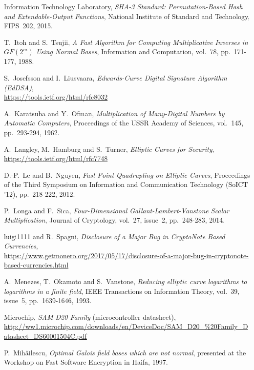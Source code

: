 \documentclass{llncs}
\newcommand{\GF}{GF}
\begin{document}
\begin{thebibliography}{20}
Information Technology Laboratory,
\emph{SHA-3 Standard: Permutation-Based Hash and Extendable-Output
Functions},
National Institute of Standard and Technology, FIPS~202, 2015.

T.~Itoh and S.~Tsujii,
\emph{A Fast Algorithm for Computing Multiplicative Inverses in
$\GF(2^m)$ Using Normal Bases},
Information and Computation, vol.~78, pp.~171-177, 1988.

S.~Josefsson and I.~Liusvaara,
\emph{Edwards-Curve Digital Signature Algorithm (EdDSA)},\\
\url{https://tools.ietf.org/html/rfc8032}

A.~Karatsuba and Y.~Ofman,
\emph{Multiplication of Many-Digital Numbers by Automatic Computers},
Proceedings of the USSR Academy of Sciences, vol.~145, pp.~293-294, 1962.

A.~Langley, M.~Hamburg and S.~Turner,
\emph{Elliptic Curves for Security},\\
\url{https://tools.ietf.org/html/rfc7748}

D.-P.~Le and B.~Nguyen,
\emph{Fast Point Quadrupling on Elliptic Curves},
Proceedings of the Third Symposium on Information and Communication
Technology (SoICT '12), pp.~218-222, 2012.

P.~Longa and F.~Sica,
\emph{Four-Dimensional Gallant-Lambert-Vanstone Scalar Multiplication},
Journal of Cryptology, vol.~27, issue~2, pp.~248-283, 2014.

luigi1111 and R.~Spagni,
\emph{Disclosure of a Major Bug in CryptoNote Based Currencies},\\
\url{https://www.getmonero.org/2017/05/17/disclosure-of-a-major-bug-in-cryptonote-based-currencies.html}

A.~Menezes, T.~Okamoto and S.~Vanstone,
\emph{Reducing elliptic curve logarithms to logarithms in a finite field},
IEEE Transactions on Information Theory, vol.~39, issue~5,
pp.~1639-1646, 1993.

Microchip,
\emph{SAM D20 Family} (microcontroller datasheet),
\url{http://ww1.microchip.com/downloads/en/DeviceDoc/SAM_D20_%20Family_Datasheet_DS60001504C.pdf}

P.~Mihăilescu,
\emph{Optimal Galois field bases which are not normal},
presented at the Workshop on Fast Software Encryption in Haifa, 1997.


\end{thebibliography}
\end{document}
